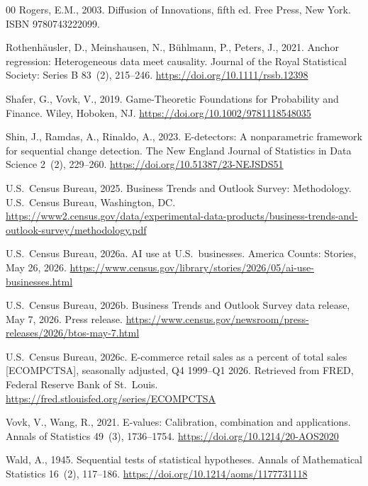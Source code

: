 \documentclass[review,authoryear,12pt]{elsarticle}
\begin{document}
\begin{thebibliography}{00}
Rogers, E.M., 2003. Diffusion of Innovations, fifth ed. Free Press, New York. ISBN 9780743222099.

Rothenh\"ausler, D., Meinshausen, N., B\"uhlmann, P., Peters, J., 2021. Anchor regression: Heterogeneous data meet causality. Journal of the Royal Statistical Society: Series B 83~(2), 215--246. \url{https://doi.org/10.1111/rssb.12398}

Shafer, G., Vovk, V., 2019. Game-Theoretic Foundations for Probability and Finance. Wiley, Hoboken, NJ. \url{https://doi.org/10.1002/9781118548035}

Shin, J., Ramdas, A., Rinaldo, A., 2023. E-detectors: A nonparametric framework for sequential change detection. The New England Journal of Statistics in Data Science 2~(2), 229--260. \url{https://doi.org/10.51387/23-NEJSDS51}

U.S.~Census Bureau, 2025. Business Trends and Outlook Survey: Methodology. U.S.\ Census Bureau, Washington, DC. \url{https://www2.census.gov/data/experimental-data-products/business-trends-and-outlook-survey/methodology.pdf}

U.S.~Census Bureau, 2026a. AI use at U.S.\ businesses. America Counts: Stories, May 26, 2026. \url{https://www.census.gov/library/stories/2026/05/ai-use-businesses.html}

U.S.~Census Bureau, 2026b. Business Trends and Outlook Survey data release, May 7, 2026. Press release. \url{https://www.census.gov/newsroom/press-releases/2026/btos-may-7.html}

U.S.~Census Bureau, 2026c. E-commerce retail sales as a percent of total sales [ECOMPCTSA], seasonally adjusted, Q4 1999--Q1 2026. Retrieved from FRED, Federal Reserve Bank of St.\ Louis. \url{https://fred.stlouisfed.org/series/ECOMPCTSA}

Vovk, V., Wang, R., 2021. E-values: Calibration, combination and applications. Annals of Statistics 49~(3), 1736--1754. \url{https://doi.org/10.1214/20-AOS2020}

Wald, A., 1945. Sequential tests of statistical hypotheses. Annals of Mathematical Statistics 16~(2), 117--186. \url{https://doi.org/10.1214/aoms/1177731118}


\end{thebibliography}
\end{document}
